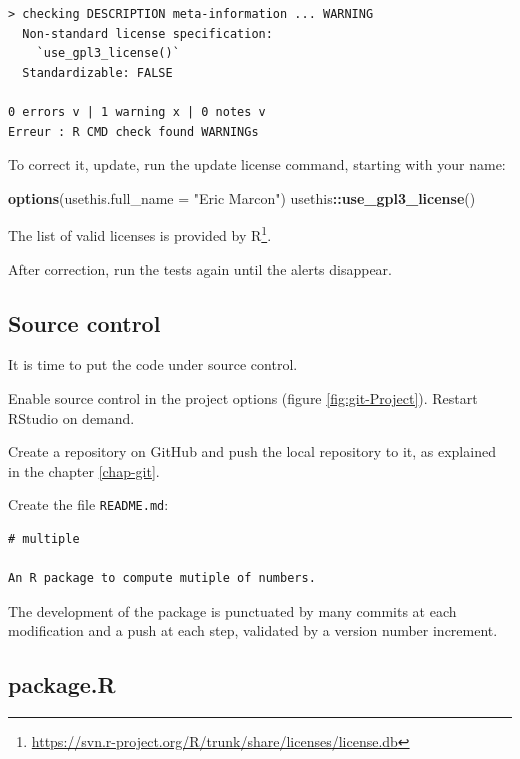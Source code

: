 \documentclass[
  12pt,
  american,
  a4paper,
  extrafontsizes,onecolumn,openright
  ]{memoir}
\newenvironment{Shaded}{\begin{snugshade}}{\end{snugshade}}
\newcommand{\AttributeTok}[1]{\textcolor[rgb]{0.13,0.29,0.53}{#1}}
\newcommand{\FunctionTok}[1]{\textcolor[rgb]{0.13,0.29,0.53}{\textbf{#1}}}
\newcommand{\NormalTok}[1]{#1}
\newcommand{\SpecialCharTok}[1]{\textcolor[rgb]{0.81,0.36,0.00}{\textbf{#1}}}
\newcommand{\StringTok}[1]{\textcolor[rgb]{0.31,0.60,0.02}{#1}}
\begin{document}
\begin{verbatim}
> checking DESCRIPTION meta-information ... WARNING
  Non-standard license specification:
    `use_gpl3_license()`
  Standardizable: FALSE

0 errors v | 1 warning x | 0 notes v
Erreur : R CMD check found WARNINGs
\end{verbatim}

To correct it, update, run the update license command, starting with your name:

\scriptsize

\begin{Shaded}
\begin{Highlighting}[]
\FunctionTok{options}\NormalTok{(}\AttributeTok{usethis.full\_name =} \StringTok{"Eric Marcon"}\NormalTok{)}
\NormalTok{usethis}\SpecialCharTok{::}\FunctionTok{use\_gpl3\_license}\NormalTok{()}
\end{Highlighting}
\end{Shaded}

\normalsize

The list of valid licenses is provided by R\footnote{\url{https://svn.r-project.org/R/trunk/share/licenses/license.db}}.

After correction, run the tests again until the alerts disappear.

\subsection{Source control}\label{sec:package-cds}

It is time to put the code under source control.

Enable source control in the project options (figure \ref{fig:git-Project}).
Restart RStudio on demand.

Create a repository on GitHub and push the local repository to it, as explained in the chapter \ref{chap-git}.

Create the file \texttt{README.md}:

\begin{verbatim}
# multiple

An R package to compute mutiple of numbers.
\end{verbatim}

The development of the package is punctuated by many commits at each modification and a push at each step, validated by a version number increment.

\subsection{package.R}\label{package.r}
\end{document}
